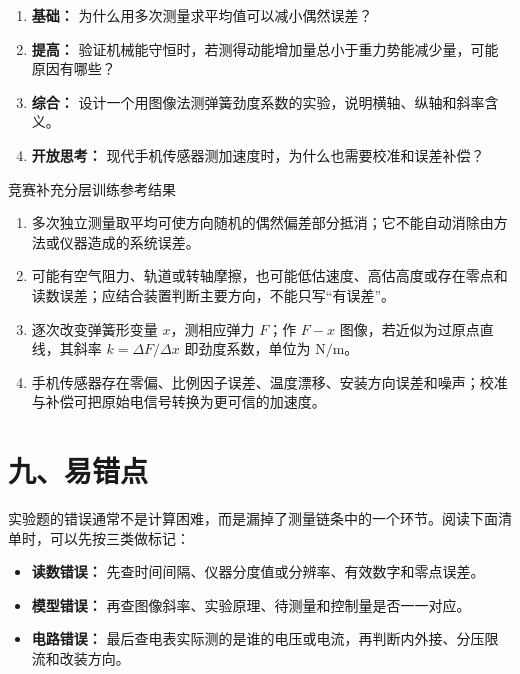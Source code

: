 \begin{enumerate}
  \item \textbf{基础：} 为什么用多次测量求平均值可以减小偶然误差？
  \item \textbf{提高：} 验证机械能守恒时，若测得动能增加量总小于重力势能减少量，可能原因有哪些？
  \item \textbf{综合：} 设计一个用图像法测弹簧劲度系数的实验，说明横轴、纵轴和斜率含义。
  \begin{center}
  
  \end{center}
  \item \textbf{开放思考：} 现代手机传感器测加速度时，为什么也需要校准和误差补偿？
\end{enumerate}

\begin{learningbox}{竞赛补充分层训练参考结果}
\begin{enumerate}[itemsep=0.45em,topsep=0.3em,parsep=0pt]
  \item 多次独立测量取平均可使方向随机的偶然偏差部分抵消；它不能自动消除由方法或仪器造成的系统误差。
  \item 可能有空气阻力、轨道或转轴摩擦，也可能低估速度、高估高度或存在零点和读数误差；应结合装置判断主要方向，不能只写“有误差”。
  \item 逐次改变弹簧形变量 $x$，测相应弹力 $F$；作 $F-x$ 图像，若近似为过原点直线，其斜率 $k=\Delta F/\Delta x$ 即劲度系数，单位为 $\mathrm{N/m}$。
  \item 手机传感器存在零偏、比例因子误差、温度漂移、安装方向误差和噪声；校准与补偿可把原始电信号转换为更可信的加速度。
\end{enumerate}
\end{learningbox}

\section*{九、易错点}

实验题的错误通常不是计算困难，而是漏掉了测量链条中的一个环节。阅读下面清单时，可以先按三类做标记：
\begin{itemize}
  \item \textbf{读数错误：} 先查时间间隔、仪器分度值或分辨率、有效数字和零点误差。
  \item \textbf{模型错误：} 再查图像斜率、实验原理、待测量和控制量是否一一对应。
  \item \textbf{电路错误：} 最后查电表实际测的是谁的电压或电流，再判断内外接、分压限流和改装方向。
\end{itemize}

